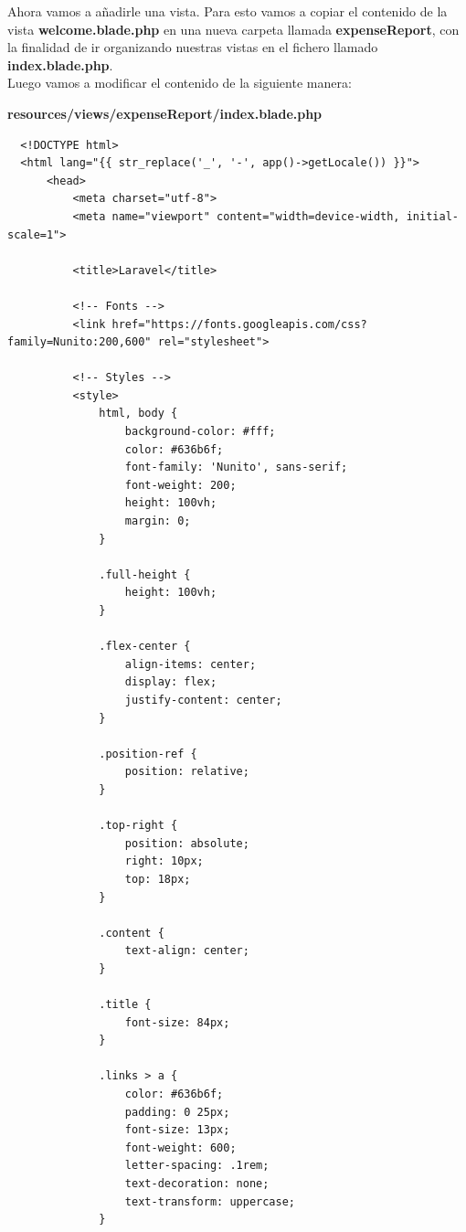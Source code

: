 \documentclass{article}
\begin{document}
Ahora vamos a añadirle una vista. Para esto vamos a copiar el contenido de la
vista \textbf{welcome.blade.php} en una nueva carpeta llamada
\textbf{expenseReport}, con la finalidad de ir organizando nuestras vistas en
el fichero llamado \textbf{index.blade.php}.\\

Luego vamos a modificar el contenido de la siguiente manera:

\textbf{resources/views/expenseReport/index.blade.php}
\begin{verbatim}
  <!DOCTYPE html>
  <html lang="{{ str_replace('_', '-', app()->getLocale()) }}">
      <head>
          <meta charset="utf-8">
          <meta name="viewport" content="width=device-width, initial-scale=1">

          <title>Laravel</title>

          <!-- Fonts -->
          <link href="https://fonts.googleapis.com/css?family=Nunito:200,600" rel="stylesheet">

          <!-- Styles -->
          <style>
              html, body {
                  background-color: #fff;
                  color: #636b6f;
                  font-family: 'Nunito', sans-serif;
                  font-weight: 200;
                  height: 100vh;
                  margin: 0;
              }

              .full-height {
                  height: 100vh;
              }

              .flex-center {
                  align-items: center;
                  display: flex;
                  justify-content: center;
              }

              .position-ref {
                  position: relative;
              }

              .top-right {
                  position: absolute;
                  right: 10px;
                  top: 18px;
              }

              .content {
                  text-align: center;
              }

              .title {
                  font-size: 84px;
              }

              .links > a {
                  color: #636b6f;
                  padding: 0 25px;
                  font-size: 13px;
                  font-weight: 600;
                  letter-spacing: .1rem;
                  text-decoration: none;
                  text-transform: uppercase;
              }


\end{verbatim}
\end{document}
